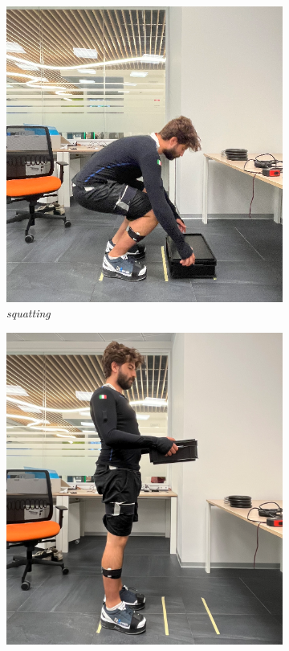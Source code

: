 \begin{figure}[htp]
\begin{subfigure}[b]{0.15\textwidth}
         \includegraphics[width=\textwidth]{figures/gianmar_squatting.png}
         \caption{\emph{squatting}}
         \label{fig:lift_squatting}
     \end{subfigure}
     \hfill
     \begin{subfigure}[b]{0.15\textwidth}
         \centering
         \includegraphics[width=\textwidth]{figures/gianmar_rising.png}

\end{subfigure}
\end{figure}

